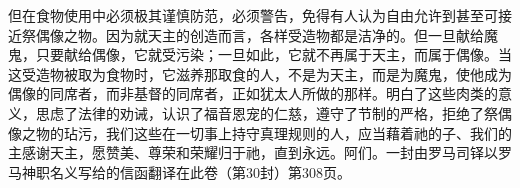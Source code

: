 但在食物使用中必须极其谨慎防范，必须警告，免得有人认为自由允许到甚至可接近祭偶像之物。因为就天主的创造而言，各样受造物都是洁净的。但一旦献给魔鬼，只要献给偶像，它就受污染；一旦如此，它就不再属于天主，而属于偶像。当这受造物被取为食物时，它滋养那取食的人，不是为天主，而是为魔鬼，使他成为偶像的同席者，而非基督的同席者，正如犹太人所做的那样。明白了这些肉类的意义，思虑了法律的劝诫，认识了福音恩宠的仁慈，遵守了节制的严格，拒绝了祭偶像之物的玷污，我们这些在一切事上持守真理规则的人，应当藉着祂的子、我们的主感谢天主，愿赞美、尊荣和荣耀归于祂，直到永远。阿们。一封由罗马司铎以罗马神职名义写给的信函翻译在此卷（第30封）第308页。\par

